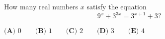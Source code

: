 How many real numbers $x$ satisfy the equation
\[9^x+3^{3x}=3^{x+1}+3?\]

$\textbf{(A) }0\qquad \textbf{(B) } 1\qquad\textbf{(C) } 2\qquad\textbf{(D) } 3\qquad\textbf{(E) }4$
